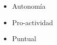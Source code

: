 \twocolumnsection
{
\begin{skills}
\end{skills}}
{
\vspace{1em}
\begin{itemize}
	\item Autonomía
    \item Pro-actividad
    \item Puntual
\end{itemize}
}
